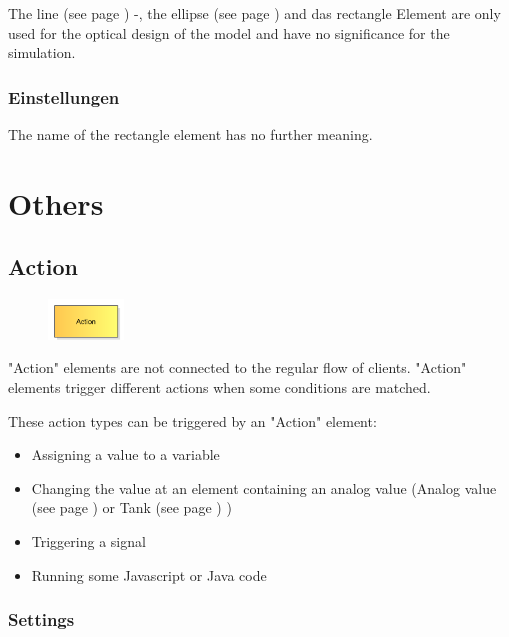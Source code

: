 The line (see page \pageref{ref:ModelElementLine}) -, the ellipse (see page \pageref{ref:ModelElementEllipse}) and
das rectangle Element are only used for the optical design of the model and have no significance for the simulation.

\subsection*{Einstellungen}

The name of the rectangle element has no further meaning.





\chapter{Others}

\section{Action}
\label{ref:ModelElementAction}

\begin{figure}
\vspace{-22pt}
\includegraphics[width=2cm]{imageModelElementAction.png}
\vspace{-22pt}
\end{figure}

"Action" elements are not connected to the regular flow of clients.
"Action" elements trigger different actions when some conditions are matched.

These action types can be triggered by an "Action" element:

\begin{itemize}
  \item Assigning a value to a variable 
  \item Changing the value at an element containing an analog value
  (Analog value (see page \pageref{ref:ModelElementAnalogValue}) or Tank (see page \pageref{ref:ModelElementTank}) )
  \item Triggering a signal 
  \item Running some Javascript or Java code 
\end{itemize}

\subsection*{Settings}

